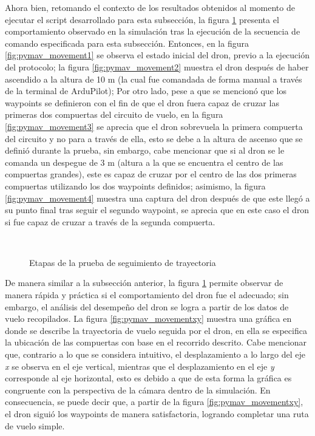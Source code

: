 Ahora bien, retomando el contexto de los resultados obtenidos al momento de ejecutar el script desarrollado para esta subsección, 
la figura \ref{fig:pymav_movement} presenta el comportamiento observado en la simulación tras la ejecución de la secuencia de comando especificada para esta subsección. Entonces, en la figura \ref{fig:pymav_movement1} se observa el estado inicial del dron, previo a la ejecución del protocolo; la figura \ref{fig:pymav_movement2} muestra el dron después de haber ascendido a la altura de 10 m (la cual fue comandada de forma manual a través de la terminal de ArduPilot); Por otro lado, pese a que se mencionó que los waypoints se definieron con el fin de que el dron fuera capaz de cruzar las primeras dos compuertas del circuito de vuelo, en la figura \ref{fig:pymav_movement3} se aprecia que el dron sobrevuela la primera compuerta del circuito y no para a través de ella, esto se debe a la altura de ascenso que se definió durante la prueba, sin embargo, cabe mencionar que si al dron se le comanda un despegue de 3 m (altura a la que se encuentra el centro de las compuertas grandes), este es capaz de cruzar por el centro de las dos primeras compuertas utilizando los dos waypoints definidos; asimismo, la figura \ref{fig:pymav_movement4} muestra una captura del dron después de que este llegó a su punto final tras seguir el segundo waypoint, se aprecia que en este caso el dron si fue capaz de cruzar a través de la segunda compuerta.

\begin{figure}[ht]
    \centering
    \hfill
    \\
    \hfill
    \hfill

    \caption{Etapas de la prueba de seguimiento de trayectoria}
    \label{fig:pymav_movement}
\end{figure}

De manera similar a la subsección anterior, la figura \ref{fig:pymav_movement} permite observar de manera rápida y práctica si el comportamiento del dron fue el adecuado; sin embargo, el análisis del desempeño del dron se logra a partir de los datos de vuelo recopilados. La figura \ref{fig:pymav_movementxy} muestra una gráfica en donde se describe la trayectoria de vuelo seguida por el dron, en ella se especifica la ubicación de las compuertas con base en el recorrido descrito. Cabe mencionar que, contrario a lo que se considera intuitivo, el desplazamiento a lo largo del eje \textit{x} se observa en el eje vertical, mientras que el desplazamiento en el eje \textit{y} corresponde al eje horizontal, esto es debido a que de esta forma la gráfica es congruente con la perspectiva de la cámara dentro de la simulación. En consecuencia, se puede decir que, a partir de la figura \ref{fig:pymav_movementxy}, el dron siguió los waypoints de manera satisfactoria, logrando completar una ruta de vuelo simple. 

